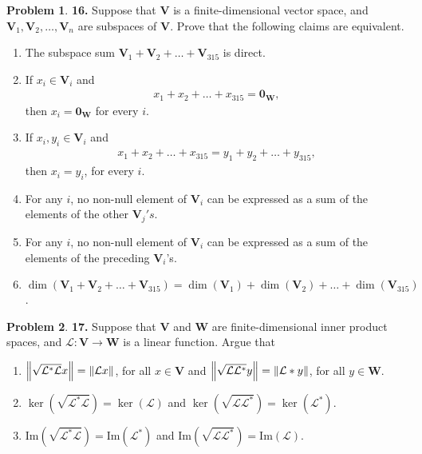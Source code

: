 \documentclass{article}
\theoremstyle{definition}
\newtheorem*{prob*}{Problem}
\newcommand{\V}{\mathbf{V}}
\newcommand{\W}{\mathbf{W}}
\newcommand{\lag}{\mathcal{L}}
\newcommand{\ima}{\text{Im}}
\begin{document}
\begin{prob*}\textbf{16.} Suppose that $\V$ is a finite-dimensional vector space, and $\V_1, \V_2,\dots,\V_n$ are subspaces of $\V$. Prove that the following claims are equivalent. 
	
	\begin{enumerate}
		\item The subspace sum $\V_1 + \V_2 + \dots + \V_{315}$ is direct. 
		
		\item If $x_i \in \V_i$ and 
		\begin{align*}
		x_1 + x_2 + \dots + x_{315} = \mathbf{0}_\W,
		\end{align*}
		then $x_i = \mathbf{0}_{\W}$ for every $i$.
		
		
		
		\item If $x_i, y_i \in \V_i$ and 
		\begin{align*}
		x_1 + x_2 + \dots + x_{315} = y_1 + y_2 + \dots + y_{315},
		\end{align*}
		then $x_i = y_i$, for every $i$. 
		
		
		\item For any $i$, no non-null element of $\V_i$ can be expressed as a sum of the elements of the other $\V_j's$.
		
		\item For any $i$, no non-null element of $\V_i$ can be expressed as a sum of the elements of the preceding $\V_i$'s.
		
		\item $\dim(\V_1 + \V_2 + \dots + \V_{315}) = \dim(\V_1) + \dim(\V_2) + \dots + \dim(\V_{315})$.
	\end{enumerate}
	
\end{prob*}




\newpage



\begin{prob*}\textbf{17.} Suppose that $\V$ and $\W$ are finite-dimensional inner product spaces, and $\lag : \V \to \W$ is a linear function. Argue that 
	
	\begin{enumerate}
		\item $\norm{\sqrt{\lag^*\lag} x} = \norm{\lag x}$, for all $x\in \V$ and $\norm{\sqrt{\lag\lag^*} y} = \norm{\lag* y}$, for all $y\in \W$.
		
		
		\item $\ker(\sqrt{\lag^*\lag}) = \ker(\lag)$ and $\ker(\sqrt{\lag\lag^*}) = \ker(\lag^*)$.
		
		
		\item $\ima(\sqrt{\lag^*\lag}) = \ima(\lag^*)$ and $\ima(\sqrt{\lag\lag^*}) = \ima(\lag)$. 
	\end{enumerate}
	
\end{prob*}
\end{document}
